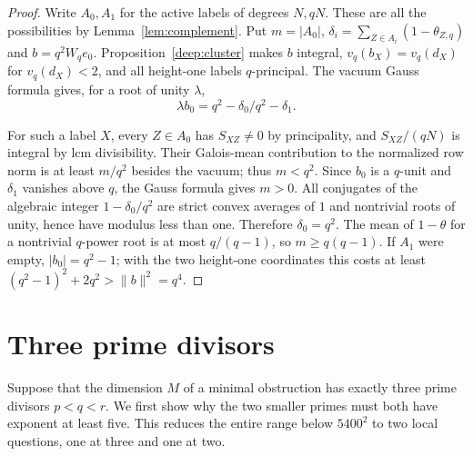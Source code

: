 \documentclass[11pt,a4paper]{article}
\numberwithin{equation}{section}
\theoremstyle{remark}
\begin{document}
\begin{proof}
Write $A_0,A_1$ for the active labels of degrees $N,qN$. These are all
the possibilities by Lemma~\ref{lem:complement}. Put $m=|A_0|$,
$\delta_i=\sum_{Z\in A_i}(1-\theta_{Z,q})$ and $b=q^2W_q e_0$.
Proposition~\ref{deep:cluster} makes $b$ integral,
$v_q(b_X)=v_q(d_X)$ for $v_q(d_X)<2$, and all height-one labels
$q$-principal. The vacuum Gauss formula gives, for a root of unity $\lambda$,
\[
      \lambda b_0=q^2-\delta_0/q^2-\delta_1 .
\]

For such a label $X$, every $Z\in A_0$ has $S_{XZ}\ne0$ by
principality, and $S_{XZ}/(qN)$ is integral by lcm divisibility.
Their Galois-mean contribution to the normalized row norm is at least
$m/q^2$ besides the vacuum; thus $m<q^2$. Since $b_0$ is a $q$-unit
and $\delta_1$ vanishes above $q$, the Gauss formula gives $m>0$.
All conjugates of the algebraic integer $1-\delta_0/q^2$ are strict
convex averages of $1$ and nontrivial roots of unity, hence have
modulus less than one. Therefore $\delta_0=q^2$. The mean of
$1-\theta$ for a nontrivial $q$-power root is at most $q/(q-1)$,
so $m\ge q(q-1)$. If $A_1$ were empty, $|b_0|=q^2-1$;
with the two height-one coordinates this costs at least
$(q^2-1)^2+2q^2>\|b\|^2=q^4$.

\end{proof}

\section{Three prime divisors}\label{short:three-prime}
Suppose that the dimension $M$ of a minimal obstruction has exactly
three prime divisors $p<q<r$. We first show why the two smaller primes
must both have exponent at least five. This reduces the entire range below
$5400^2$ to two local questions, one at three and one at two.
\end{document}
